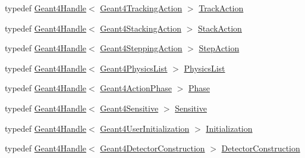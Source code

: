 \begin{DoxyCompactItemize}
\item 
typedef \hyperlink{class_d_d4hep_1_1_simulation_1_1_geant4_handle}{Geant4Handle}$<$ \hyperlink{class_d_d4hep_1_1_simulation_1_1_geant4_tracking_action}{Geant4TrackingAction} $>$ \hyperlink{namespace_d_d4hep_1_1_simulation_1_1_setup_ab8429f4d09699162358a80f1c6d6955f}{TrackAction}
\item 
typedef \hyperlink{class_d_d4hep_1_1_simulation_1_1_geant4_handle}{Geant4Handle}$<$ \hyperlink{class_d_d4hep_1_1_simulation_1_1_geant4_stacking_action}{Geant4StackingAction} $>$ \hyperlink{namespace_d_d4hep_1_1_simulation_1_1_setup_a2656383b49e01ac46b211b6f30d17d5a}{StackAction}
\item 
typedef \hyperlink{class_d_d4hep_1_1_simulation_1_1_geant4_handle}{Geant4Handle}$<$ \hyperlink{class_d_d4hep_1_1_simulation_1_1_geant4_stepping_action}{Geant4SteppingAction} $>$ \hyperlink{namespace_d_d4hep_1_1_simulation_1_1_setup_a8a860273aa78bb79db7b588476284a99}{StepAction}
\item 
typedef \hyperlink{class_d_d4hep_1_1_simulation_1_1_geant4_handle}{Geant4Handle}$<$ \hyperlink{class_d_d4hep_1_1_simulation_1_1_geant4_physics_list}{Geant4PhysicsList} $>$ \hyperlink{namespace_d_d4hep_1_1_simulation_1_1_setup_a40c6d28ab3022c7744f6a1f28f38bd72}{PhysicsList}
\item 
typedef \hyperlink{class_d_d4hep_1_1_simulation_1_1_geant4_handle}{Geant4Handle}$<$ \hyperlink{class_d_d4hep_1_1_simulation_1_1_geant4_action_phase}{Geant4ActionPhase} $>$ \hyperlink{namespace_d_d4hep_1_1_simulation_1_1_setup_a088b816eb9fc39c4188455b8a5769632}{Phase}
\item 
typedef \hyperlink{class_d_d4hep_1_1_simulation_1_1_geant4_handle}{Geant4Handle}$<$ \hyperlink{class_d_d4hep_1_1_simulation_1_1_geant4_sensitive}{Geant4Sensitive} $>$ \hyperlink{namespace_d_d4hep_1_1_simulation_1_1_setup_ac10ac91464a827e81aaf5e8aa77ca56c}{Sensitive}
\item 
typedef \hyperlink{class_d_d4hep_1_1_simulation_1_1_geant4_handle}{Geant4Handle}$<$ \hyperlink{class_d_d4hep_1_1_simulation_1_1_geant4_user_initialization}{Geant4UserInitialization} $>$ \hyperlink{namespace_d_d4hep_1_1_simulation_1_1_setup_ad0eadfa9fa826619419b5350ce1bafae}{Initialization}
\item 
typedef \hyperlink{class_d_d4hep_1_1_simulation_1_1_geant4_handle}{Geant4Handle}$<$ \hyperlink{class_d_d4hep_1_1_simulation_1_1_geant4_detector_construction}{Geant4DetectorConstruction} $>$ \hyperlink{namespace_d_d4hep_1_1_simulation_1_1_setup_a8405db8ef232c0fb524d029682e94005}{DetectorConstruction}

\end{DoxyCompactItemize}
